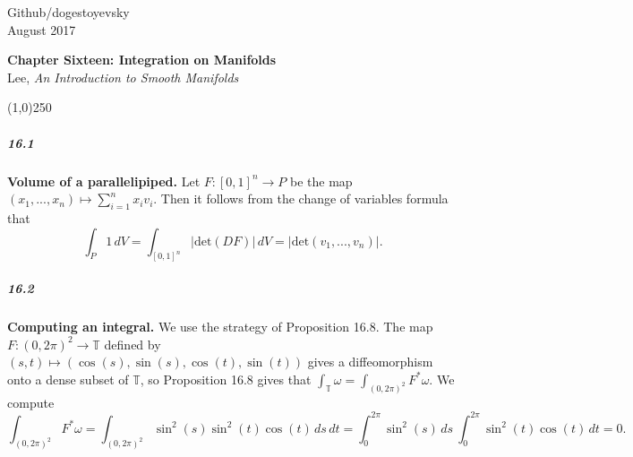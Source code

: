 \documentclass[10pt,letter]{article}
\begin{document}
\noindent Github/dogestoyevsky \\
August 2017
\begin{center}
\textbf{Chapter Sixteen: Integration on Manifolds}\\ Lee, \textit{An Introduction to Smooth Manifolds}

\line(1,0){250}
\end{center}
\subparagraph*{16.1} {\bf Volume of a parallelipiped.} Let $F: [0,1]^n \rightarrow P$ be the map $(x_1,...,x_n) \mapsto \sum_{i=1}^n x_i v_i$. Then it follows from the change of variables formula that \[ \int_P 1 \, dV = \int_{[0,1]^n} \vert \text{det}(DF) \vert \,  dV = \vert \text{det}(v_1,...,v_n) \vert. \]

\subparagraph*{16.2} {\bf Computing an integral.} We use the strategy of Proposition 16.8. The map $F: (0,2\pi)^2 \rightarrow \mathbb{T}$ defined by $(s,t) \mapsto (\cos(s),\sin(s),\cos(t),\sin(t))$ gives a diffeomorphism onto a dense subset of $\mathbb{T}$, so Proposition 16.8 gives that $\int_{\mathbb{T}} \omega = \int_{(0,2\pi)^2} F^{\ast}\omega$. We compute
\begin{dmath*} \int_{(0,2\pi)^2} F^{\ast}\omega = \int_{(0,2\pi)^2} \sin^2(s) \sin^2(t) \cos(t) \, ds \, dt = \int_0^{2\pi} \sin^2(s) \, ds \ \int_0^{2\pi} \sin^2(t) \cos(t) \, dt = 0.
\end{dmath*}
\end{document}
